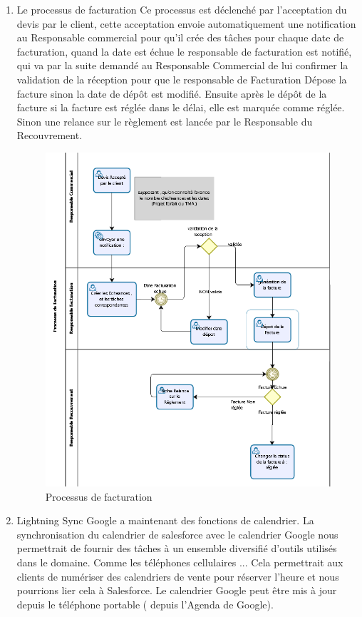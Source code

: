 \documentclass[a4paper, 12pt]{report}
\begin{document}
\begin{itemize}
\begin{enumerate}
\item {Le processus de facturation }
Ce processus est déclenché par l'acceptation du devis par le client, cette acceptation envoie automatiquement une notification au Responsable commercial pour qu'il crée des tâches pour chaque date de facturation, quand la date est échue le responsable de facturation est notifié, qui va par la suite demandé au Responsable Commercial de lui confirmer la validation de la réception pour que le responsable de Facturation Dépose la facture sinon la  date de dépôt est modifié.
Ensuite après le dépôt de la facture si la facture est réglée dans le délai, elle est marquée comme réglée. Sinon une relance sur le règlement est lancée par le Responsable du Recouvrement.

\begin{figure}[H]
\centering
\caption{Processus de facturation}
\includegraphics[scale=0.9]{processusfacturation.png}
\end{figure}
\item {Lightning Sync}
Google a maintenant des fonctions de calendrier. La synchronisation du calendrier de salesforce avec le calendrier Google nous permettrait de fournir des tâches à un ensemble diversifié d'outils utilisés dans le domaine. Comme les téléphones cellulaires ... Cela permettrait aux clients de numériser des calendriers de vente pour réserver l'heure et nous pourrions lier cela à Salesforce. Le calendrier Google peut être mis à jour depuis le téléphone portable ( depuis l'Agenda de Google). 

\end{enumerate}
\end{itemize}
\end{document}
